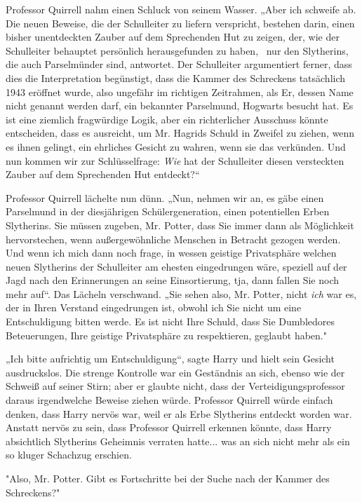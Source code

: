 {Professor Quirrell nahm einen Schluck von seinem Wasser. „Aber ich schweife ab. Die neuen Beweise, die der Schulleiter zu liefern verspricht, bestehen darin, einen bisher unentdeckten Zauber auf dem Sprechenden Hut zu zeigen, der, wie der Schulleiter behauptet persönlich herausgefunden zu haben, ~nur den Slytherins, die auch Parselmünder sind, antwortet. Der Schulleiter argumentiert ferner, dass dies die Interpretation begünstigt, dass die Kammer des Schreckens tatsächlich 1943 eröffnet wurde, also ungefähr im richtigen Zeitrahmen, als Er, dessen Name nicht genannt werden darf, ein bekannter Parselmund, Hogwarts besucht hat. Es ist eine ziemlich fragwürdige Logik, aber ein richterlicher Ausschuss könnte entscheiden, dass es ausreicht, um Mr. Hagrids Schuld in Zweifel zu ziehen, wenn es ihnen gelingt, ein ehrliches Gesicht zu wahren, wenn sie das verkünden. Und nun kommen wir zur Schlüsselfrage: \emph{Wie} hat der Schulleiter diesen versteckten Zauber auf dem Sprechenden Hut entdeckt?“

Professor Quirrell lächelte nun dünn. „Nun, nehmen wir an, es gäbe einen Parselmund in der diesjährigen Schülergeneration, einen potentiellen Erben Slytherins. Sie müssen zugeben, Mr. Potter, dass Sie immer dann als Möglichkeit hervorstechen, wenn außergewöhnliche Menschen in Betracht gezogen werden. Und wenn ich mich dann noch frage, in wessen geistige Privatsphäre welchen neuen Slytherins der Schulleiter am ehesten eingedrungen wäre, speziell auf der Jagd nach den Erinnerungen an seine Einsortierung, tja, dann fallen Sie noch mehr auf“. Das Lächeln verschwand. „Sie sehen also, Mr. Potter, nicht \emph{ich} war es, der in Ihren Verstand eingedrungen ist, obwohl ich Sie nicht um eine Entschuldigung bitten werde. Es ist nicht Ihre Schuld, dass Sie Dumbledores Beteuerungen, Ihre geistige Privatsphäre zu respektieren, geglaubt haben."

„Ich bitte aufrichtig um Entschuldigung“, sagte Harry und hielt sein Gesicht ausdruckslos. Die strenge Kontrolle war ein Geständnis an sich, ebenso wie der Schweiß auf seiner Stirn; aber er glaubte nicht, dass der Verteidigungsprofessor daraus irgendwelche Beweise ziehen würde. Professor Quirrell würde einfach denken, dass Harry nervös war, weil er als Erbe Slytherins entdeckt worden war. Anstatt nervös zu sein, dass Professor Quirrell erkennen könnte, dass Harry absichtlich Slytherins Geheimnis verraten hatte... was an sich nicht mehr als ein so kluger Schachzug erschien.

"Also, Mr. Potter. Gibt es Fortschritte bei der Suche nach der Kammer des Schreckens?"

}
